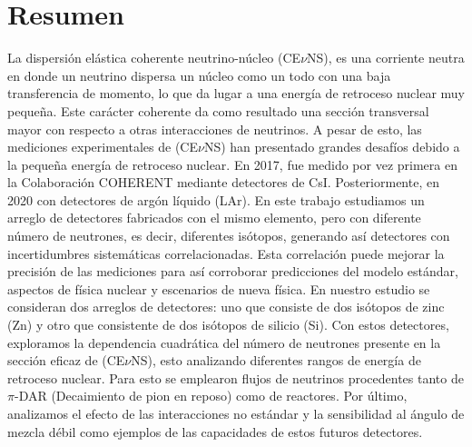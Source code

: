\chapter*{Resumen}

La dispersión elástica coherente neutrino-núcleo (CE$\nu$NS), es una corriente neutra en donde un neutrino dispersa un núcleo como un todo con una baja transferencia de momento, lo que da lugar a una energía de retroceso nuclear muy pequeña. Este carácter coherente da como resultado una sección transversal mayor con respecto a otras interacciones de neutrinos. A pesar de esto, las mediciones experimentales de (CE$\nu$NS) han presentado grandes desafíos debido a la pequeña energía de retroceso nuclear. En 2017, fue medido por vez primera en la Colaboración COHERENT mediante detectores de CsI. Posteriormente, en 2020 con detectores de argón líquido (LAr). En este trabajo estudiamos un arreglo de detectores fabricados con el mismo elemento, pero con diferente número de neutrones, es decir, diferentes isótopos, generando así detectores con incertidumbres sistemáticas correlacionadas. Esta correlación puede mejorar la precisión de las mediciones para así corroborar predicciones del modelo estándar, aspectos de física nuclear y escenarios de nueva física. En nuestro estudio se consideran dos arreglos de detectores: uno que consiste de dos isótopos de zinc (Zn) y otro que consistente de dos isótopos de silicio (Si). Con estos detectores, exploramos la dependencia cuadrática del número de neutrones presente en la sección eficaz de (CE$\nu$NS), esto analizando diferentes rangos de energía de retroceso nuclear. Para esto se emplearon flujos de neutrinos procedentes tanto de $\pi$-DAR (Decaimiento de pion en reposo) como de reactores. Por último, analizamos el efecto de las interacciones no estándar y la sensibilidad al ángulo de mezcla débil como ejemplos de las capacidades de estos futuros detectores.
